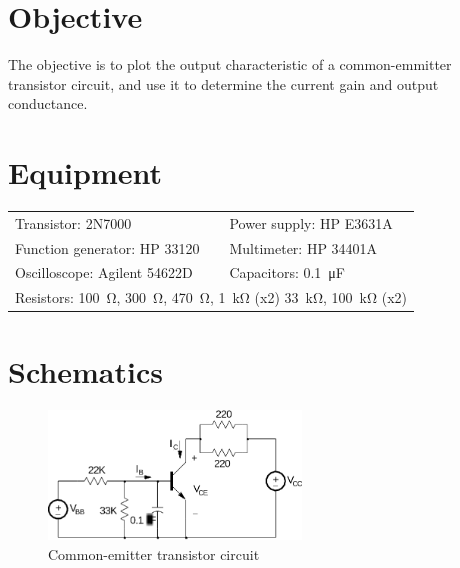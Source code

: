 

\section{Objective}

The objective is to plot the output characteristic of a common-emmitter transistor circuit, and use it to determine the current gain and output conductance.

\section{Equipment}

\begin{tabular}{ll}
  \centering
  Transistor: 2N7000               & Power supply: HP E3631A            \\
  Function generator: HP 33120 & Multimeter: HP 34401A              \\
  Oscilloscope: Agilent 54622D & Capacitors: \SI{0.1}{\micro\farad} \\
  \multicolumn{2}{l}{Resistors: \SI{100}{\ohm}, \SI{300}{\ohm}, \SI{470}{\ohm}, \SI{1}{\kilo\ohm} (x2) \SI{33}{\kilo\ohm}, \SI{100}{\kilo\ohm} (x2)} \\
\end{tabular}

\section{Schematics}

\begin{figure}[hbtp]
  \centering
  \includegraphics[width=0.6\textwidth]{circuit}
  \caption{\label{fig:circuit} Common-emitter transistor circuit}
\end{figure}

